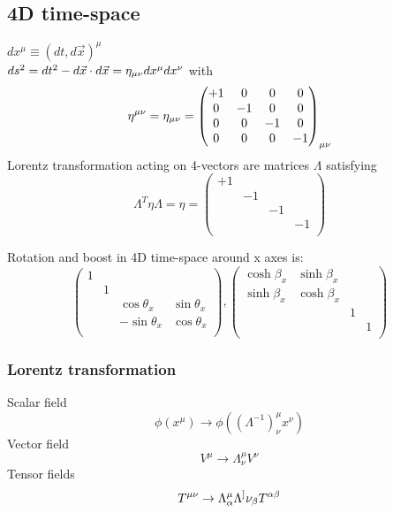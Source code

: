 \subsection{4D time-space}   
$dx^{\mu} \equiv (dt, d\vec{x})^{\mu}$ \\
$ ds^{2} = dt^{2} - d\vec{x}\cdot d\vec{x} =
\eta_{\mu\nu}dx^{\mu}dx^{\nu}$	with 
\begin{equation}
    \eta^{\mu\nu} = \eta_{\mu\nu} = 
    \begin{pmatrix}
	+1  & 0	  & 0  & 0	\\
	0   & -1  & 0  & 0	\\
	0   & 0	  & -1 & 0	\\
	0   & 0	  & 0  & -1
    \end{pmatrix}_{\mu\nu}
    \label{Minkowski metric}
\end{equation}
Lorentz transformation acting on 4-vectors are matrices $\Lambda$ satisfying
\[
    \Lambda^T\eta\Lambda = \eta = 
    \begin{pmatrix}
	+1  &	&   &	\\
	    & -1&   &  	\\
	    &	& -1&  	\\
	    &	&   & -1\\
    \end{pmatrix}
    \]
    
Rotation and boost in 4D time-space around x axes is:
\begin{equation*}
    \begin{pmatrix}
	1   &	&   &	\\
	    & 1 &   &	\\
	    &	& \cos\theta_x	& \sin\theta_x	\\
	    &	& -\sin\theta_x	& \cos\theta_x	\\
    \end{pmatrix},
    \begin{pmatrix}
	\cosh\beta_x	& \sinh\beta_x	&   &	\\
	\sinh\beta_x	& \cosh\beta_x	&   &	\\
	    &	& 1 &  	\\
	    &	&   & 1	\\
    \end{pmatrix}
\end{equation*}
    
\subsubsection{Lorentz transformation}
Scalar field
\[
    \phi(x^\mu)\rightarrow\phi((\Lambda^{-1})^\mu_\nu x^\nu)
    \]
Vector field
\[
    V^\mu\rightarrow\Lambda^\mu_\nu V^\nu
    \]
Tensor fields
\[
    T^{\mu\nu}\rightarrow\Lambda^\mu_\alpha\Lambda^]\nu_\beta T^{\alpha\beta}
    \]
